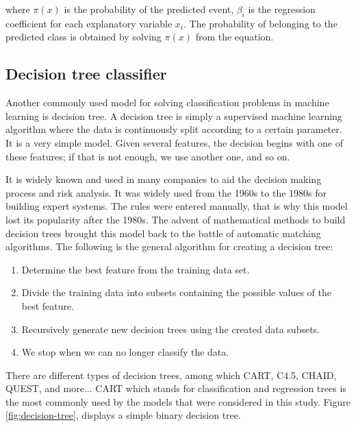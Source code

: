 \documentclass[LaM,binding=0.6cm, english]{sapthesis}
\begin{document}
where \(\pi(x)\) is the probability of the predicted event, \(\beta_i\) is the regression coefficient for each explanatory variable \(x_i\). The probability of belonging to the predicted class is obtained by solving \(\pi(x)\) from the equation.\cite{Hosmer2000}

\subsection{Decision tree classifier}

Another commonly used model for solving classification problems in machine learning is decision tree. A decision tree is simply a supervised machine learning algorithm where the data is continuously split according to a certain parameter. It is a very simple model. Given several features, the decision begins with one of these features; if that is not enough, we use another one, and so on. 

\par It is widely known and used in many companies to aid the decision making process and risk analysis. It was widely used from the 1960s to the 1980s for building expert systems. The rules were entered manually, that is why this model lost its popularity after the 1980s. The advent of mathematical methods to build decision trees brought this model back to the battle of automatic matching algorithms. The following is the general algorithm for creating a decision tree:

\begin{enumerate}
	\item Determine the best feature from the training data set.
  	\item Divide the training data into subsets containing the possible values of the best feature.
  	\item Recursively generate new decision trees using the created data subsets.
  	\item We stop when we can no longer classify the data.
\end{enumerate}

There are different types of decision trees, among which CART, C4.5, CHAID, QUEST, and more...\cite{Song2015} CART which stands for classification and regression trees is the most commonly used by the models that were considered in this study. Figure \ref{fig:decision-tree}, displays a simple binary decision tree.
\end{document}

